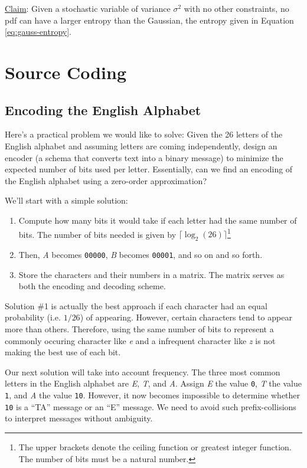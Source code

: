 \documentclass[13pt,oneside]{tufte-book}
\providecommand{\tightlist}{%
  \setlength{\itemsep}{0pt}\setlength{\parskip}{0pt}}
\theoremstyle{definition}
\theoremstyle{definition}
\theoremstyle{definition}
\theoremstyle{remark}
\begin{document}
\underline{Claim}: Given a stochastic variable of variance \(\sigma^2\)
with no other constraints, no pdf can have a larger entropy than the
Gaussian, the entropy given in Equation \eqref{eq:gauss-entropy}.

\chapter{Source Coding}\label{source-coding}

\section{Encoding the English
Alphabet}\label{encoding-the-english-alphabet}

Here's a practical problem we would like to solve: Given the 26 letters
of the English alphabet and assuming letters are coming independently,
design an encoder (a schema that converts text into a binary message) to
minimize the expected number of bits used per letter. Essentially, can
we find an encoding of the English alphabet using a zero-order
approximation?

We'll start with a simple solution:

\begin{enumerate}
\def\labelenumi{\arabic{enumi}.}
\tightlist
\item
  Compute how many bits it would take if each letter had the same number
  of bits. The number of bits needed is given by
  \(\lceil \log_2(26)\rceil\)\footnote{The upper brackets denote the
    ceiling function or greatest integer function. The number of bits
    must be a natural number.}
\item
  Then, \emph{A} becomes \texttt{00000}, \emph{B} becomes
  \texttt{00001}, and so on and so forth.
\item
  Store the characters and their numbers in a matrix. The matrix serves
  as both the encoding and decoding scheme.
\end{enumerate}

Solution \#1 is actually the best approach if each character had an
equal probability (i.e. \(1/26\)) of appearing. However, certain
characters tend to appear more than others. Therefore, using the same
number of bits to represent a commonly occuring character like \emph{e}
and a infrequent character like \emph{z} is not making the best use of
each bit.

Our next solution will take into account frequency. The three most
common letters in the English alphabet are \emph{E}, \emph{T}, and
\emph{A}. Assign \emph{E} the value \texttt{0}, \emph{T} the value
\texttt{1}, and \emph{A} the value \texttt{10}. However, it now becomes
impossible to determine whether \texttt{10} is a ``TA'' message or an
``E'' message. We need to avoid such prefix-collisions to interpret
messages without ambiguity.
\end{document}
